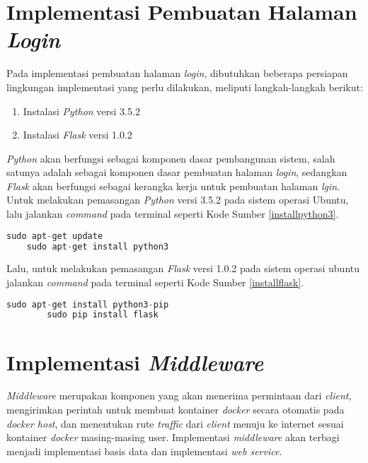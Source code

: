   \section{Implementasi Pembuatan Halaman \textit{Login}}
  Pada implementasi pembuatan halaman \textit{login}, dibutuhkan beberapa persiapan lingkungan implementasi yang perlu dilakukan, meliputi langkah-langkah berikut:
  \begin{enumerate}
  	\item Instalasi \textit{Python} versi 3.5.2
  	\item Instalasi \textit{Flask} versi 1.0.2
  \end{enumerate}
  \textit{Python} akan berfungsi sebagai komponen dasar pembangunan sistem, salah satunya adalah sebagai komponen dasar pembuatan halaman \textit{login}, sedangkan \textit{Flask} akan berfungsi sebagai kerangka kerja untuk pembuatan halaman \textit{lgin}. Untuk melakukan pemasangan \textit{Python} versi 3.5.2 pada sistem operasi Ubuntu, lalu jalankan \textit{command} pada terminal seperti Kode Sumber \ref{installpython3}.\\
  \begin{minipage}{\linewidth}
  	\begin{lstlisting}[caption=Command untuk installasi Python,language=Python,label=installpython3]
  	sudo apt-get update
  	sudo apt-get install python3
  	\end{lstlisting}
  \end{minipage}
  Lalu, untuk melakukan pemasangan \textit{Flask} versi 1.0.2 pada sistem operasi ubuntu jalankan \textit{command} pada terminal seperti Kode Sumber \ref{installflask}.\\
	\begin{minipage}{\linewidth}
	   	\begin{lstlisting}[caption=Command untuk installasi Flask,language=Python,label=installflask]
	   	sudo apt-get install python3-pip
	   	sudo pip install flask
	   	\end{lstlisting}
	\end{minipage}
	
  \section{Implementasi \textit{Middleware}}
  \textit{Middleware} merupakan komponen yang akan menerima permintaan dari \textit{client}, mengirimkan perintah untuk membuat kontainer \textit{docker} secara otomatis pada \textit{docker host}, dan menentukan rute \textit{traffic} dari \textit{client} menuju ke internet sesuai kontainer \textit{docker} masing-masing user. Implementasi \textit{middleware} akan terbagi menjadi implementasi basis data dan implementasi \textit{web service}.

